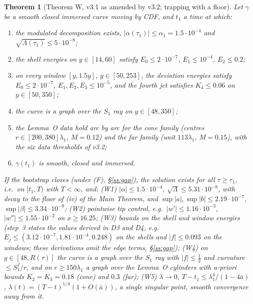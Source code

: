 \documentclass[11pt]{amsart}
\newtheorem{theorem}{Theorem}[section]
\theoremstyle{definition}
\theoremstyle{remark}
\newcommand{\Lam}{\Lambda}
\begin{document}
\begin{theorem}[Theorem W, v3.1 as amended by v3.2; trapping with a floor]\label{thm:W}
Let $\gamma$ be a smooth closed immersed curve moving by CDF, and $t_1$ a time at which:
\begin{enumerate}[label=\textup{(H\arabic*)},leftmargin=*,itemsep=1pt]
\item the modulated decomposition exists, $|\alpha(\tau_1)|\le\alpha_1=1.5\cdot10^{-4}$ and $\sqrt{\Lam(\tau_1)}\le5\cdot10^{-8}$;
\item the shell energies on $y\in[14,60]$ satisfy $E_0\le2\cdot10^{-7}$, $E_1\le10^{-4}$, $E_2\le0.2$;
\item on every window $[y,1.5y]$, $y\in[50,253]$, the deviation energies satisfy $E_0\le2\cdot10^{-7}$, $E_1,E_2,E_3\le10^{-5}$, and the fourth jet satisfies $K_4\le0.06$ on $y\in[50,350]$;
\item the curve is a graph over the $S_1$ ray on $y\in[48,350]$;
\item the Lemma~O data hold arc by arc for the cone family (centres $r\in[200,380]\lambda_1$, $M=0.12$) and the far family (unit $113\lambda_1$, $M=0.15$), with the six data thresholds of v3.2;
\item $\gamma(t_1)$ is smooth, closed and immersed.
\end{enumerate}
If the bootstrap closes (under (F), \S\ref{ss:gap}), the solution exists for all $\tau\ge\tau_1$, i.e.\ on $[t_1,T)$ with $T<\infty$, and: \textup{(W1)} $|\alpha|\le1.5\cdot10^{-4}$, $\sqrt\Lam\le5.31\cdot10^{-8}$, with decay to the floor of (iv) of the Main Theorem, and $\sup|a|,\sup|b|\le2.19\cdot10^{-7}$, $\sup|\beta|\le3.34\cdot10^{-9}$; \textup{(W2)} pointwise tip control, e.g.\ $|w'|\le1.16\cdot10^{-3}$, $|w''|\le1.55\cdot10^{-2}$ on $x\ge16.25$; \textup{(W3)} bounds on the shell and window energies (step~3 states the values derived in D3 and D4, e.g.\ $E_j\le(3.12\cdot10^{-7},1.81\cdot10^{-4},0.248)$ on the shells and $|f|\le0.093$ on the windows; these derivations omit the edge terms, \S\ref{ss:gap}); \textup{(W4)} on $y\in[48,R(\tau)]$ the curve is a graph over the $S_1$ ray with $|f|\le\frac12$ and curvature $\le S_1^f/r$, and on $r\ge150\lambda_1$ a graph over the Lemma~O cylinders with a-priori bounds $K_2=K_3=0.18$ (cone) and $0.3$ (far); \textup{(W5)} $\lambda\to0$, $T-t_1\le\lambda_1^4/(1-4\bar a)$, $\lambda(t)=(T-t)^{1/4}(1+O(\bar a))$, a single singular point, smooth convergence away from it.
\end{theorem}
\end{document}
